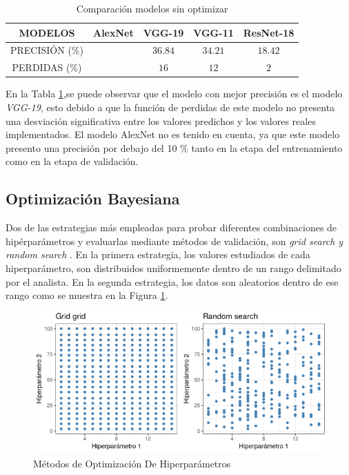 \begin{table}[ht]
	\centering
	\begin{tabular}{|c|c|c|c|c|}
		\hline
		MODELOS & AlexNet & VGG-19 & VGG-11 & ResNet-18 \\
		\hline
		PRECISIÓN (\%) &  & $$36.84$$ & $$34.21$$ & $$18.42$$ \\
		\hline
		PERDIDAS (\%) &  & $$16$$ & $$12$$ & $$2$$ \\
		\hline
	\end{tabular}	
	\caption{Comparación modelos sin optimizar}
	\label{table:compasin}
\end{table}	

En la Tabla \ref{table:compasin},se puede observar que el modelo con mejor precisión es el modelo \textit{VGG-19}, esto debido a que la función de perdidas de este modelo no presenta una desviación significativa entre los valores predichos y los valores reales implementados. El modelo AlexNet no es tenido en cuenta, ya que este modelo presento una precisión por debajo del 10 \% tanto en la etapa del entrenamiento como en la etapa de validación.


\newpage
\subsection{Optimización Bayesiana}

Dos de las estrategias más empleadas para probar diferentes combinaciones de hipérparámetros y evaluarlas mediante métodos de validación, son \textit{grid search y random search} \cite{liashchynskyi2019grid}. En la primera estrategia, los valores estudiados de cada hiperparámetro, son distribuidos uniformemente dentro de un rango delimitado por el analista. En la segunda estrategia, los datos son aleatorios dentro de ese rango como se muestra en la Figura \ref{fig:Hiperparámetros grid search y random search}.

\begin{figure}[ht]
	\centering
	\includegraphics[scale=0.6]{Figs/121.png}
	\caption{Métodos de Optimización De Hiperparámetros}
	\label{fig:Hiperparámetros grid search y random search}
\end{figure}

